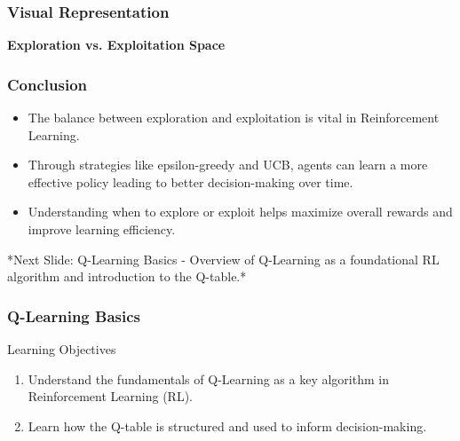 \documentclass[aspectratio=169]{beamer}
\begin{document}
\begin{frame}[fragile]
    \frametitle{Visual Representation}
    \begin{center}
        \textbf{Exploration vs. Exploitation Space}
        
    \end{center}
\end{frame}

\begin{frame}[fragile]
    \frametitle{Conclusion}
    \begin{itemize}
        \item The balance between exploration and exploitation is vital in Reinforcement Learning.
        \item Through strategies like epsilon-greedy and UCB, agents can learn a more effective policy leading to better decision-making over time.
        \item Understanding when to explore or exploit helps maximize overall rewards and improve learning efficiency.
    \end{itemize}
    
    *Next Slide: Q-Learning Basics - Overview of Q-Learning as a foundational RL algorithm and introduction to the Q-table.*
\end{frame}

\begin{frame}[fragile]
    \frametitle{Q-Learning Basics}
    \begin{block}{Learning Objectives}
        \begin{enumerate}
            \item Understand the fundamentals of Q-Learning as a key algorithm in Reinforcement Learning (RL).
            \item Learn how the Q-table is structured and used to inform decision-making.
        \end{enumerate}
    \end{block}
\end{frame}
\end{document}
